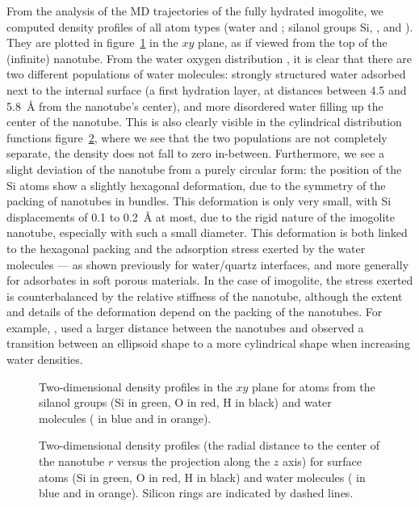 \documentclass[thesis]{subfiles}
\begin{document}
From the analysis of the MD trajectories of the fully hydrated imogolite, we
computed density profiles of all atom types (water  and ;
silanol groups Si, , and ). They are plotted in
figure~\ref{fig:imogolite:density:xy} in the $xy$ plane, \ie as if viewed from
the top of the (infinite) nanotube. From the water oxygen distribution ,
it is clear that there are two different populations of water molecules:
strongly structured water adsorbed next to the internal surface (a first hydration
layer, at distances between 4.5 and \SI{5.8}{\AA} from the nanotube's center),
and more disordered water filling up the center of the nanotube. This is also
clearly visible in the cylindrical distribution functions
figure~\ref{fig:imogolite:density:rz}, where we see that the two populations are
not completely separate, \ie the density does not fall to zero in-between.
Furthermore, we see a slight deviation of the nanotube from a purely circular
form: the position of the Si atoms show a slightly hexagonal deformation, due to
the symmetry of the packing of nanotubes in bundles\cite{Amara2014}. This
deformation is only very small, with Si displacements of 0.1 to \SI{0.2}{\AA} at
most, due to the rigid nature of the imogolite nanotube, especially with such a
small diameter. This deformation is both linked to the hexagonal packing and the
adsorption stress exerted by the water molecules --- as shown previously for
water/quartz interfaces\cite{Gor2016}, and more generally for adsorbates in soft
porous materials\cite{Neimark2009, Mouhat2015}. In the case of imogolite, the
stress exerted is counterbalanced by the relative stiffness of the nanotube,
although the extent and details of the deformation depend on the packing of the
nanotubes. For example, \citeauthor{Creton2008}\cite{Creton2008}, used a larger
distance between the nanotubes and observed a transition between an ellipsoid
shape to a more cylindrical shape when increasing water densities.

\begin{figure}[ht]
    \centering
    
    \caption{Two-dimensional density profiles in the $xy$ plane for atoms from
    the silanol groups (Si in green, O in red, H in black) and water molecules
    ( in blue and  in orange).}
    \label{fig:imogolite:density:xy}
\end{figure}

\begin{figure}[ht]
    \centering
    
    \caption{Two-dimensional density profiles (the radial distance to the center
    of the nanotube $r$ versus the projection along the $z$ axis) for surface
    atoms (Si in green, O in red, H in black) and water molecules ( in
    blue and  in orange). Silicon rings are indicated by dashed lines.}
    \label{fig:imogolite:density:rz}
\end{figure}
\end{document}
